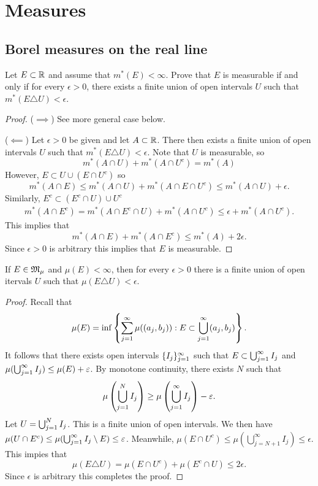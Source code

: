 \documentclass[a4paper]{article}
\begin{document}
\maketitle

\tableofcontents

\section{Measures}
\setcounter{subsection}{4}
\subsection{Borel measures on the real line}

\begin{ex}
Let $E \subset \mathbb{R}$ and assume that $m^* (E) < \infty$. 
Prove that $E$ is measurable if and only if for every 
$\epsilon > 0$, there exists a finite union of open intervals $U$ such that 
$m^* (E \triangle U) < \epsilon$. 
\end{ex}

\begin{proof}
($\implies$) See more general case below.


($\impliedby$) Let $\epsilon > 0$ be given and let $A \subset \mathbb{R}$. 
There then exists a finite 
union of open intervals $U$ such that $m^* (E \triangle U) < \epsilon$.
Note that $U$ is measurable, so 
\[
m^* (A \cap U) + m^* (A \cap U^c) = m^* (A)
\]
However, $E \subset U \cup (E \cap U^c)$ so
\[
m^* (A \cap E) \leq m^* (A \cap U) + m^* (A \cap E \cap U^c)
\leq m^* (A \cap U) + \epsilon.
\]
Similarly, $E^c \subset (E^c \cap U) \cup U^c$
\[
\begin{aligned}
  m^* (A \cap E^c) 
  = m^* (A \cap E^c \cap U) + m^* (A \cap U^c)
  \leq \epsilon + m^* (A \cap U^c).
\end{aligned}
\]
This implies that 
\[
m^* (A \cap E) + m^* (A \cap E^c) \leq m^* (A) + 2 \epsilon.
\]
Since $\epsilon > 0$ is arbitrary this implies that $E$ 
is measurable.
\end{proof}

\begin{ex}[Folland 1.26]
If $E \in \mathfrak{M}_\mu$ and $\mu(E) < \infty$, then for every 
$\epsilon > 0$ there is a finite union of open itervals $U$ such that 
$\mu(E \triangle U) < \epsilon$. 
\end{ex}

\begin{proof}
Recall that 
\[
\mu(E) = \inf \left\{ \sum_{j=1}^\infty \mu((a_j, b_j)) : E 
\subset \bigcup_{j=1}^\infty (a_j, b_j) \right\}.
\]
It follows that there exists open intervals $\{ I_j \}_{j=1}^\infty$ such that 
$E \subset \bigcup_{j=1}^\infty I_j$ and $\mu ( \bigcup_{j=1}^\infty I_j ) 
\leq \mu(E) + \varepsilon$.
By monotone continuity, there exists $N$ such that 
\[
\mu \left( \bigcup_{j=1}^N I_j \right) \geq 
\mu \left( \bigcup_{j=1}^\infty I_j \right) - \varepsilon.
\]
Let $U = \bigcup_{j=1}^N I_j$. This is a finite union of open intervals.
We then have $\mu(U \cap E^c) 
\leq \mu ( \bigcup_{j=1}^\infty I_j \setminus E ) \leq \varepsilon$. 
Meanwhile, $\mu(E \cap U^c) \leq \mu ( \bigcup_{j = N + 1}^\infty I_j 
) \leq \epsilon$. This impies that 
\[
\mu(E \triangle U) = \mu(E \cap U^c) + \mu(E^c \cap U) \leq 2 \epsilon.
\]
Since $\epsilon$ is arbitrary this completes the proof.
\end{proof}
\end{document}

